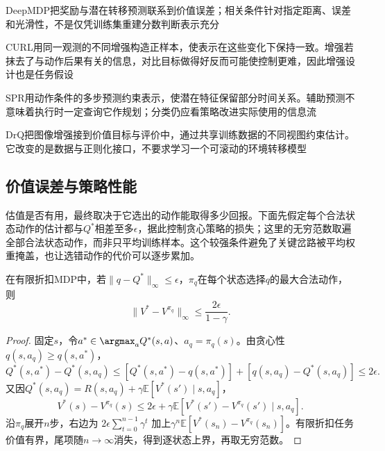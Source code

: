 DeepMDP把奖励与潜在转移预测联系到价值误差；相关条件针对指定距离、误差和光滑性，不是仅凭训练集重建分数判断表示充分

CURL用同一观测的不同增强构造正样本，使表示在这些变化下保持一致。增强若抹去了与动作后果有关的信息，对比目标做得好反而可能使控制更难，因此增强设计也是任务假设

SPR用动作条件的多步预测约束表示，使潜在特征保留部分时间关系。辅助预测不意味着执行时一定查询它作规划；分类仍应看策略改进实际使用的信息流

DrQ把图像增强接到价值目标与评价中，通过共享训练数据的不同视图约束估计。它改变的是数据与正则化接口，不要求学习一个可滚动的环境转移模型

\subsection{价值误差与策略性能}
\label{sec:rl-learning-value-performance}

估值是否有用，最终取决于它选出的动作能取得多少回报。下面先假定每个合法状态动作的估计都与$Q^*$相差至多$\epsilon$，据此控制贪心策略的损失；这里的无穷范数取遍全部合法状态动作，而非只平均训练样本。这个较强条件避免了关键岔路被平均权重掩盖，也让选错动作的代价可以逐步累加。

\begin{theorem}[动作价值误差到贪心策略损失]
  \label{thm:rl-learning-q-performance}
  在有限折扣MDP中，若$\lVert q-Q^*\rVert_\infty\leq\epsilon$，$\pi_q$在每个状态选择$q$的最大合法动作，则
  \begin{equation}
    \lVert V^*-V^{\pi_q}\rVert_\infty
       \leq\frac{2\epsilon}{1-\gamma}.
    \label{eq:rl-learning-q-performance}
  \end{equation}
\end{theorem}
\begin{proof}
  固定$s$，令$a^*\in\argmax_aQ^*(s,a)$、$a_q=\pi_q(s)$。由贪心性$q(s,a_q)\geq q(s,a^*)$，
  \[
    Q^*(s,a^*)-Q^*(s,a_q)
      \leq[Q^*(s,a^*)-q(s,a^*)]
            +[q(s,a_q)-Q^*(s,a_q)]\leq2\epsilon.
  \]
  又因$Q^*(s,a_q)=R(s,a_q)+\gamma\mathbb E[V^*(s')\mid s,a_q]$，
  \[
    V^*(s)-V^{\pi_q}(s)
      \leq2\epsilon+\gamma
          \mathbb E[V^*(s')-V^{\pi_q}(s')\mid s,a_q].
  \]
  沿$\pi_q$展开$n$步，右边为
  $2\epsilon\sum_{t=0}^{n-1}\gamma^t$
  加上$\gamma^n\mathbb E[V^*(s_n)-V^{\pi_q}(s_n)]$。有限折扣任务价值有界，尾项随$n\to\infty$消失，得到逐状态上界，再取无穷范数。
\end{proof}

